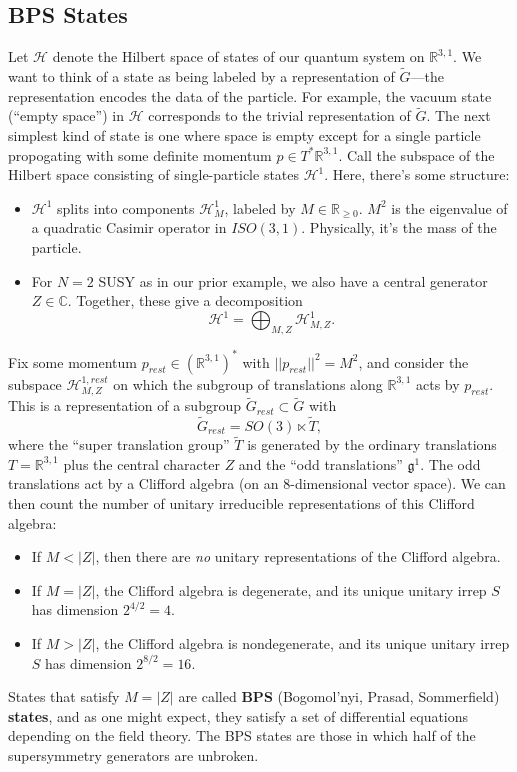 \documentclass[oneside,english]{amsbook}
\numberwithin{section}{chapter}
\numberwithin{equation}{section}
\numberwithin{figure}{section}
\theoremstyle{plain}
\theoremstyle{definition}
\theoremstyle{remark}
\theoremstyle{definition}
\theoremstyle{definition}
\theoremstyle{plain}
\begin{document}
\subsection{BPS States}

Let $\mathcal{H}$ denote the Hilbert space of states of our quantum
system on $\mathbb{R}^{3,1}$. We want to think of a state as being
labeled by a representation of $\tilde{G}$---the representation encodes
the data of the particle. For example, the vacuum state (``empty
space'') in $\mathcal{H}$ corresponds to the trivial representation
of $\tilde{G}$. The next simplest kind of state is one where space
is empty except for a single particle propogating with some definite
momentum $p\in T^{*}\mathbb{R}^{3,1}$. Call the subspace of the Hilbert
space consisting of single-particle states $\mathcal{H}^{1}$. Here,
there's some structure:
\begin{itemize}
\item $\mathcal{H}^{1}$ splits into components $\mathcal{H}_{M}^{1}$,
labeled by $M\in\mathbb{R}_{\geq0}$. $M^{2}$ is the eigenvalue of
a quadratic Casimir operator in $ISO(3,1)$. Physically, it's the
mass of the particle.
\item For $N=2$ SUSY as in our prior example, we also have a central generator
$Z\in\mathbb{C}$. Together, these give a decomposition
\[
\mathcal{H}^{1}=\bigoplus_{M,Z}\mathcal{H}_{M,Z}^{1}.
\]

\end{itemize}
Fix some momentum $p_{rest}\in\left(\mathbb{R}^{3,1}\right)^{*}$
with $||p_{rest}||^{2}=M^{2}$, and consider the subspace $\mathcal{H}_{M,Z}^{1,rest}$
on which the subgroup of translations along $\mathbb{R}^{3,1}$ acts
by $p_{rest}$. This is a representation of a subgroup $\tilde{G}_{rest}\subset\tilde{G}$
with
\[
\tilde{G}_{rest}=SO\left(3\right)\ltimes\tilde{T},
\]
where the ``super translation group'' $\tilde{T}$ is generated
by the ordinary translations $T=\mathbb{R}^{3,1}$ plus the central
character $Z$ and the ``odd translations'' $\mathfrak{g}^{1}$.
The odd translations act by a Clifford algebra (on an 8-dimensional
vector space). We can then count the number of unitary irreducible
representations of this Clifford algebra:
\begin{itemize}
\item If $M<\left|Z\right|$, then there are \emph{no} unitary representations
of the Clifford algebra.
\item If $M=\left|Z\right|$, the Clifford algebra is degenerate, and its
unique unitary irrep $S$ has dimension $2^{4/2}=4$.
\item If $M>\left|Z\right|$, the Clifford algebra is nondegenerate, and
its unique unitary irrep $S$ has dimension $2^{8/2}=16$.
\end{itemize}
States that satisfy $M=\left|Z\right|$ are called \textbf{BPS} (Bogomol'nyi,
Prasad, Sommerfield) \textbf{states}, and as one might expect, they
satisfy a set of differential equations depending on the field theory.
The BPS states are those in which half of the supersymmetry generators
are unbroken.
\end{document}

